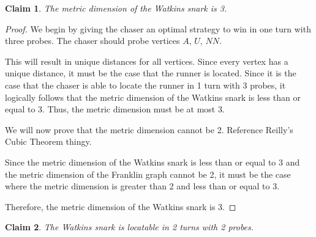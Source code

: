 \documentclass[11pt]{article}
\newtheorem{clm}{Claim}
\begin{document}
\begin{center}
	\end{center}
	\begin{clm}
		The metric dimension of the Watkins snark is 3.
	\end{clm}
	\begin{proof}
		We begin by giving the chaser an optimal strategy to win in one turn with three probes. The chaser should probe vertices $A$, $U$, $NN$.
		
		This will result in unique distances for all vertices. Since every vertex has a unique distance, it must be the case that the runner is located. Since it is the case that the chaser is able to locate the runner in 1 turn with 3 probes, it logically follows that the metric dimension of the Watkins snark is less than or equal to 3.
		Thus, the metric dimension must be at most 3.
		
		We will now prove that the metric dimension cannot be 2. Reference Reilly's Cubic Theorem thingy.
		
		Since the metric dimension of the Watkins snark is less than or equal to 3 and the metric dimension of the Franklin graph cannot be 2, it must be the case where the metric dimension is greater than 2 and less than or equal to 3.
		
		Therefore, the metric dimension of the Watkins snark is 3.
	\end{proof}
	\begin{clm}
		The Watkins snark is locatable in 2 turns with 2 probes.
	\end{clm}
\end{document}
